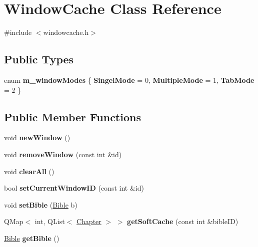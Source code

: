 \hypertarget{classWindowCache}{
\section{WindowCache Class Reference}
\label{classWindowCache}
}


{\ttfamily \#include $<$windowcache.h$>$}\subsection*{Public Types}
\begin{DoxyCompactItemize}
\item 
enum {\bfseries m\_\-windowModes} \{ {\bfseries SingelMode} =  0, 
{\bfseries MultipleMode} =  1, 
{\bfseries TabMode} =  2
 \}
\end{DoxyCompactItemize}
\subsection*{Public Member Functions}
\begin{DoxyCompactItemize}
\item 
\hypertarget{classWindowCache_ab82c978bb59d65ec4000f9c7881341e4}{
void {\bfseries newWindow} ()}
\label{classWindowCache_ab82c978bb59d65ec4000f9c7881341e4}

\item 
\hypertarget{classWindowCache_abde6a44bf7d1ee74f5e0df76318d122e}{
void {\bfseries removeWindow} (const int \&id)}
\label{classWindowCache_abde6a44bf7d1ee74f5e0df76318d122e}

\item 
\hypertarget{classWindowCache_abd278b1ee7fc49c4c9b8c903beba951d}{
void {\bfseries clearAll} ()}
\label{classWindowCache_abd278b1ee7fc49c4c9b8c903beba951d}

\item 
\hypertarget{classWindowCache_ac6edb962fa1a8e45411549c56f0efe56}{
bool {\bfseries setCurrentWindowID} (const int \&id)}
\label{classWindowCache_ac6edb962fa1a8e45411549c56f0efe56}

\item 
\hypertarget{classWindowCache_ab2b5db93f83cb93e43cfe8b8dbbd5628}{
void {\bfseries setBible} (\hyperlink{classBible}{Bible} b)}
\label{classWindowCache_ab2b5db93f83cb93e43cfe8b8dbbd5628}

\item 
\hypertarget{classWindowCache_a6e0ecd47526d5b128fda2fc58ccb5a4a}{
QMap$<$ int, QList$<$ \hyperlink{structChapter}{Chapter} $>$ $>$ {\bfseries getSoftCache} (const int \&bibleID)}
\label{classWindowCache_a6e0ecd47526d5b128fda2fc58ccb5a4a}

\item 
\hypertarget{classWindowCache_ade273ab129b581d4982140fc9b2762e1}{
\hyperlink{classBible}{Bible} {\bfseries getBible} ()}
\label{classWindowCache_ade273ab129b581d4982140fc9b2762e1}

\end{DoxyCompactItemize}
